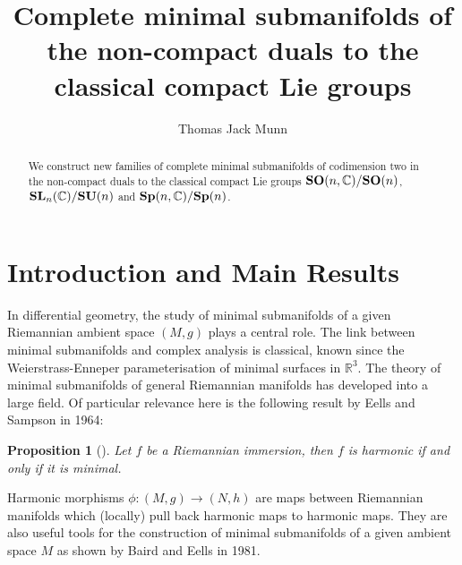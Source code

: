 \documentclass[11pt,reqno]{amsart}
\theoremstyle{plain}
\newtheorem{proposition}  [theorem]  {Proposition}
\theoremstyle{definition}
\numberwithin{equation}{section}
\def \cn{{\mathbb C}}
\def \SLC#1{\text{\bf SL}_{#1}(\cn)}
\def \SO#1{\text{\bf SO}(#1)}
\def \SOC#1{\text{\bf SO}(#1,\cn)}
\def \SU#1{\text{\bf SU}(#1)}
\def \Sp#1{\text{\bf Sp}(#1)}
\def \SpC#1{\text{\bf Sp}(#1,\cn)}
\numberwithin{equation}{section}
\begin{document}
	
	
	
	
	
\author{Thomas Jack Munn}
\address{Mathematics, Faculty of Science\\
University of Lund\\
Box 118, Lund 221 00\\
Sweden}

	
\title
[Minimal Submanifolds]
{Complete minimal submanifolds of the non-compact duals to the classical compact Lie groups}
	
	
\begin{abstract}
We construct new families of complete minimal submanifolds of codimension two in the non-compact duals to the classical compact Lie groups $\SOC n/\SO n$, $\SLC n/\SU n$ and $\SpC n/\Sp n$.
\end{abstract}

	
\maketitle

\section{Introduction and Main Results}
\label{section-introduction}
In differential geometry, the study of minimal submanifolds of a given Riemannian ambient space $(M,g)$ plays a central role. The link between minimal submanifolds and complex analysis is classical, known since the Weierstrass-Enneper  parameterisation of minimal surfaces in $\mathbb{R}^3$.
The theory of minimal submanifolds of general Riemannian manifolds has developed into a large field. Of particular relevance here is the following result by Eells and Sampson in 1964:
\begin{proposition}[\cite{Eel-Sam}]
	Let $f$ be a Riemannian immersion, then $f$ is harmonic if and only if it is minimal.
\end{proposition}


Harmonic morphisms $\phi:(M,g)\to (N,h)$ are maps between Riemannian manifolds which (locally) pull back harmonic maps to harmonic maps. They are also useful tools for the construction of minimal submanifolds of a given ambient space $M$ as shown by Baird and Eells in 1981.
\end{document}
